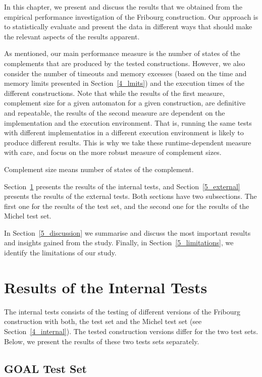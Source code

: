 In this chapter, we present and discuss the results that we obtained from the empirical performance investigation of the Fribourg construction. Our approach is to statistically evaluate and present the data in different ways that should make the relevant aspects of the results apparent. 

As mentioned, our main performance measure is the number of states of the complements that are produced by the tested constructions. However, we also consider the number of timeouts and memory excesses (based on the time and memory limits presented in Section~\ref{4_lmits}) and the execution times of the different constructions. Note that while the results of the first measure, complement size for a given automaton for a given construction, are definitive and repeatable, the results of the second measure are dependent on the implementation and the execution environment. That is, running the same tests with different implementatios in a different execution environment is likely to produce different results. This is why we take these runtime-dependent measure with care, and focus on the more robust measure of complement sizes.

Complement size means number of states of the complement.


Section~\ref{5_internal} presents the results of the internal tests, and Section~\ref{5_external} presents the results of the external tests. Both sections have two subsections. The first one for the results of the \goal{} test set, and the second one for the results of the Michel test set.

In Section~\ref{5_discussion} we summarise and discuss the most important results and insights gained from the study. Finally, in Section~\ref{5_limitations}, we identify the limitations of our study.


\section{Results of the Internal Tests}
\label{5_internal}
The internal tests consists of the testing of different versions of the Fribourg construction with both, the \goal{} test set and the Michel test set (see Section~\ref{4_internal}). The tested construction versions differ for the two test sets. Below, we present the results of these two tests sets separately.

\subsection{GOAL Test Set}
\label{5_internal_goal}

